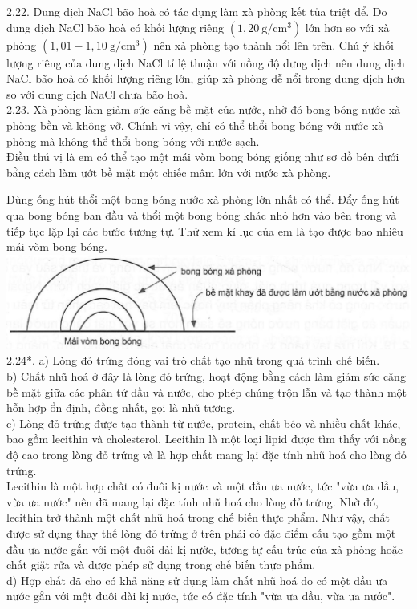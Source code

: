 \documentclass[10pt]{article}
\begin{document}
2.22. Dung dịch NaCl bão hoà có tác dụng làm xà phòng kết tủa triệt để. Do dung dịch NaCl bão hoà có khối lượng riêng $\left(1,20 \mathrm{~g} / \mathrm{cm}^{3}\right)$ lớn hơn so với xà phòng $\left(1,01-1,10 \mathrm{~g} / \mathrm{cm}^{3}\right)$ nên xà phòng tạo thành nổi lên trên. Chú ý khối lượng riêng của dung dịch NaCl tỉ lệ thuận với nồng độ dưng dịch nên dung dịch NaCl bão hoà có khối lượng riêng lớn, giúp xà phòng dễ nổi trong dung dịch hơn so với dung dịch NaCl chưa bão hoà.\\
2.23. Xà phòng làm giảm sức căng bề mặt của nước, nhờ đó bong bóng nước xà phòng bền và không vỡ. Chính vì vậy, chỉ có thể thổi bong bóng với nước xà phòng mà không thể thổi bong bóng với nước sạch.\\
Điều thú vị là em có thể tạo một mái vòm bong bóng giống như sơ đồ bên dưới bằng cách làm ướt bề mặt một chiếc mâm lớn với nước xà phòng.

Dùng ống hút thổi một bong bóng nước xà phòng lớn nhất có thể. Đẩy ống hút qua bong bóng ban đầu và thổi một bong bóng khác nhỏ hơn vào bên trong và tiếp tục lặp lại các bước tương tự. Thử xem kỉ lục của em là tạo được bao nhiêu mái vòm bong bóng.\\
\includegraphics[max width=\textwidth, center]{2025_10_23_b4e16b74380d0f7e7700g-013}\\
2.24*. a) Lòng đỏ trứng đóng vai trò chất tạo nhũ trong quá trình chế biến.\\
b) Chất nhũ hoá ở đây là lòng đỏ trứng, hoạt động bằng cách làm giảm sức căng bề mặt giữa các phân tử dầu và nước, cho phép chúng trộn lẫn và tạo thành một hỗn hợp ổn định, đồng nhất, gọi là nhũ tương.\\
c) Lòng đỏ trứng được tạo thành từ nước, protein, chất béo và nhiều chất khác, bao gồm lecithin và cholesterol. Lecithin là một loại lipid được tìm thấy với nồng độ cao trong lòng đỏ trứng và là hợp chất mang lại đặc tính nhũ hoá cho lòng đỏ trứng.\\
Lecithin là một hợp chất có đuôi kị nước và một đầu ưa nước, tức "vừa ưa dầu, vừa ưa nước" nên đã mang lại đặc tính nhũ hoá cho lòng đỏ trứng. Nhờ đó, lecithin trở thành một chất nhũ hoá trong chế biến thực phẩm. Như vậy, chất được sử dụng thay thế lòng đỏ trứng ở trên phải có đặc điểm cấu tạo gồm một đầu ưa nước gắn với một đuôi dài kị nước, tương tự cấu trúc của xà phòng hoặc chất giặt rửa và được phép sử dụng trong chế biến thực phẩm.\\
d) Hợp chất đã cho có khả năng sử dụng làm chất nhũ hoá do có một đầu ưa nước gắn với một đuôi dài kị nước, tức có đặc tính "vừa ưa dầu, vừa ưa nước".
\end{document}
